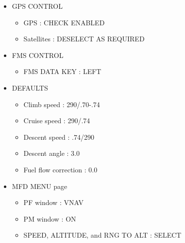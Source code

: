 \begin{itemize}
\begin{itemize}
\begin{itemize}
\end{itemize}

\item GPS CONTROL

\begin{itemize}
\item GPS : CHECK ENABLED

\item Satellites : DESELECT AS REQUIRED

\end{itemize}

\item FMS CONTROL

\begin{itemize}
\item FMS DATA KEY : LEFT

\end{itemize}

\item DEFAULTS

\begin{itemize}
\item Climb speed : 290\slash .70-.74

\item Cruise speed : 290\slash .74

\item Descent speed : .74\slash 290

\item Descent angle : 3.0

\item Fuel flow correction : 0.0

\end{itemize}

\item MFD MENU page

\begin{itemize}
\item PF window : VNAV

\item PM window : ON

\item SPEED, ALTITUDE, and RNG TO ALT : SELECT

\end{itemize}

\end{itemize}

\end{itemize}

